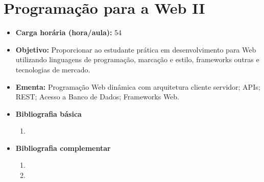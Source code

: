 \documentclass[
	10pt,				%
	openright,			%
	twoside,			%
	a4paper,			%
	english,			%
	french,				%
	brazil,				%
	sumario=tradicional
]{abntex2}
\begin{document}


\newpage
\section*{Programação para a Web II}\label{5_ppw2}
\begin{itemize}
	\item \textbf{Carga horária (hora/aula):} 54
	\item \textbf{Objetivo:} Proporcionar ao estudante prática em desenvolvimento para Web utilizando linguagens de programação, marcação e estilo, frameworks outras e tecnologias de mercado.
	\item \textbf{Ementa:} 
	Programação Web dinâmica com arquitetura cliente servidor;
	APIs;
	REST;
	Acesso a Banco de Dados;
	Frameworks Web.
	\item \textbf{Bibliografia básica}
	\begin{enumerate}
		\item 
	\end{enumerate}
	\item \textbf{Bibliografia complementar}
	\begin{enumerate}
		\item
		\item 
	\end{enumerate}
\end{itemize}


\newpage
\end{document}
